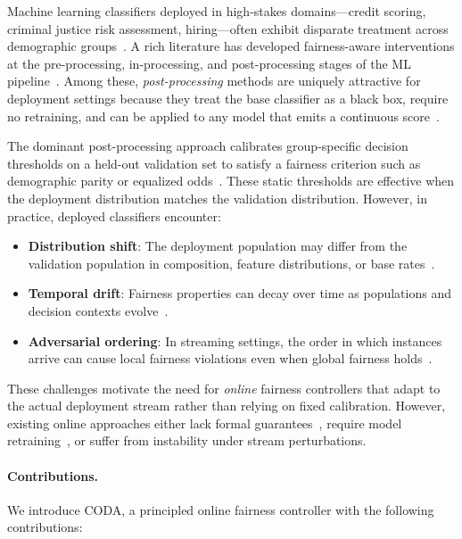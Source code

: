 \documentclass[10pt,twocolumn]{article}
\theoremstyle{definition}
\begin{document}
Machine learning classifiers deployed in high-stakes domains---credit scoring, criminal justice risk assessment, hiring---often exhibit disparate treatment across demographic groups~\cite{barocas2016big,chouldechova2017fair}. A rich literature has developed fairness-aware interventions at the pre-processing, in-processing, and post-processing stages of the ML pipeline~\cite{caton2024fairness,mehrabi2021survey}. Among these, \emph{post-processing} methods are uniquely attractive for deployment settings because they treat the base classifier as a black box, require no retraining, and can be applied to any model that emits a continuous score~\cite{hardt2016equality,pleiss2017fairness}.

The dominant post-processing approach calibrates group-specific decision thresholds on a held-out validation set to satisfy a fairness criterion such as demographic parity or equalized odds~\cite{hardt2016equality,menon2018cost}. These static thresholds are effective when the deployment distribution matches the validation distribution. However, in practice, deployed classifiers encounter:
\begin{itemize}
    \item \textbf{Distribution shift}: The deployment population may differ from the validation population in composition, feature distributions, or base rates~\cite{singh2024fairness}.
    \item \textbf{Temporal drift}: Fairness properties can decay over time as populations and decision contexts evolve~\cite{chen2025fairnessdrift}.
    \item \textbf{Adversarial ordering}: In streaming settings, the order in which instances arrive can cause local fairness violations even when global fairness holds~\cite{gillen2018online}.
\end{itemize}

These challenges motivate the need for \emph{online} fairness controllers that adapt to the actual deployment stream rather than relying on fixed calibration. However, existing online approaches either lack formal guarantees~\cite{zhang2020fairness}, require model retraining~\cite{roh2021fairbatch}, or suffer from instability under stream perturbations.

\paragraph{Contributions.} We introduce CODA, a principled online fairness controller with the following contributions:
\end{document}
